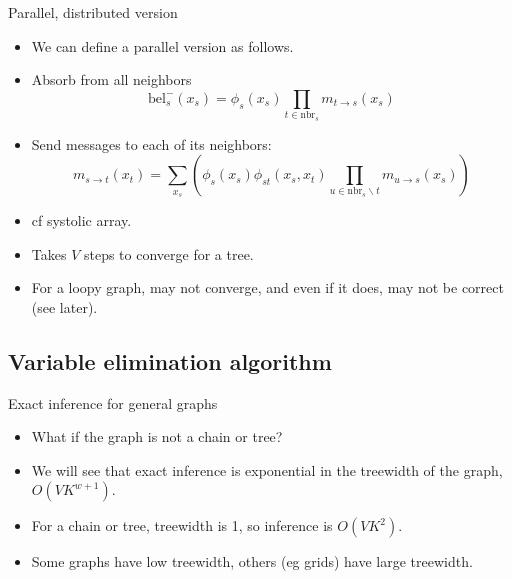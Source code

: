 \documentclass[10pt,mathserif]{beamer}
\begin{document}
\begin{frame}{Parallel, distributed version}
\begin{itemize}
    \item We can define a parallel version as follows.
    \item Absorb from all neighbors
    \begin{equation}
        \text{bel}_s^-(x_s) = \phi_s(x_s)\prod_{t\in\text{nbr}_s}m_{t\rightarrow s}(x_s)
    \end{equation}
    
    \item Send messages to each of its neighbors:
    \begin{equation}
        m_{s\rightarrow t} (x_t) = \sum_{x_s}(\phi_s(x_s)\phi_{st}(x_s,x_t)\prod_{u\in\text{nbr}_s\backslash t}m_{u\rightarrow s}(x_s))
    \end{equation}
    
    \item cf systolic array.
    \item Takes $V$ steps to converge for a tree.
    \item For a loopy graph, may not converge, and even if it does, may not be correct (see later).
\end{itemize}
\end{frame}

\subsection{Variable elimination algorithm}
\begin{frame}{Exact inference for general graphs}
\begin{itemize}
    \item What if the graph is not a chain or tree?
    \item We will see that exact inference is exponential in the
    treewidth of the graph, $O(VK^{w+1})$.
    \item For a chain or tree, treewidth is 1, so inference is $O(VK^2)$.
    \item Some graphs have low treewidth, others (eg grids) have large treewidth.
\end{itemize}
\end{frame}
\end{document}
